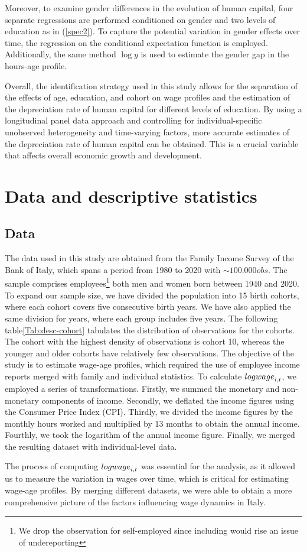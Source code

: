 \documentclass[12pt]{article}
\begin{document}
Moreover, to examine gender differences in the evolution of human capital, four separate regressions are performed
conditioned on gender and two levels of education as in (\ref{spec2}). To capture the potential variation in gender
effects over time, the
regression on the conditional expectation function is employed. Additionally, the same method $\log{y}$ is used to
estimate the gender gap in the hours-age profile.
\par
Overall, the identification strategy used in this study allows for the separation of the effects of age, education, and
cohort on wage profiles and the estimation of the depreciation rate of human capital for different levels of education.
By using a longitudinal panel data approach and controlling for individual-specific unobserved heterogeneity and
time-varying factors, more accurate estimates of the depreciation rate of human capital can be obtained. This is a
crucial variable that affects overall economic growth and development.

\section{Data and descriptive statistics}
\subsection{Data}
The data used in this study are obtained from the Family Income Survey of the Bank of Italy, which spans a period from
1980 to 2020 with $\sim100.000 obs$. The sample comprises employees\footnote{We drop the observation for self-employed
since including would rise an issue of undereporting} both men and women born between 1940 and 2020. To expand our
sample size, we have divided the population into 15 birth cohorts, where each cohort covers five consecutive birth
years. We have also applied the same division for years, where each group includes five years. The following
table\ref{Tab:desc-cohort} tabulates the distribution of observations for the cohorts. The cohort with the highest density of
observations is cohort 10, whereas the younger and older cohorts have relatively few observations. The objective of the
study is to estimate wage-age profiles, which required the use of employee income reports merged with family and
individual statistics. To calculate $\\log{wage}_{i,t}$, we employed a series of transformations. Firstly, we summed the
monetary and non-monetary components of income. Secondly, we deflated the income figures using the Consumer Price Index
(CPI). Thirdly, we divided the income figures by the monthly hours worked and multiplied by 13 months to obtain the
annual income. Fourthly, we took the logarithm of the annual income figure. Finally, we merged the resulting dataset
with individual-level data.
\par
The process of computing $\\log{wage}_{i,t}$ was essential for the analysis, as it allowed us to measure the variation
in wages over time, which is critical for estimating wage-age profiles. By merging different datasets, we were able to
obtain a more comprehensive picture of the factors influencing wage dynamics in Italy. 
\end{document}
